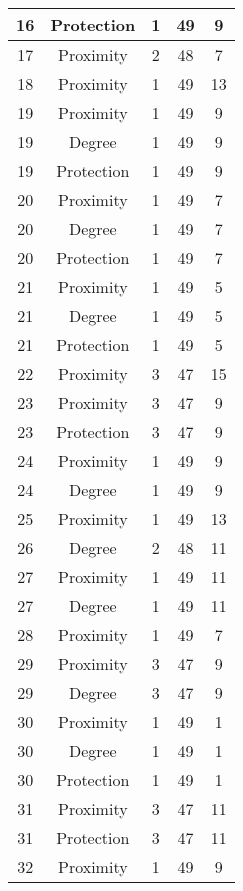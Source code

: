 \documentclass[results.tex]{subfiles}
\begin{document}
\begin{center}
\begin{tabular}{| c || c | c | c | c |}
    16 & Protection & 1 & 49 & 9 \\ 
    \hline
    17 & Proximity & 2 & 48 & 7 \\ 
    \hline
    18 & Proximity & 1 & 49 & 13 \\ 
    \hline
    19 & Proximity & 1 & 49 & 9 \\ 
    \hline
    19 & Degree & 1 & 49 & 9 \\ 
    \hline
    19 & Protection & 1 & 49 & 9 \\ 
    \hline
    20 & Proximity & 1 & 49 & 7 \\ 
    \hline
    20 & Degree & 1 & 49 & 7 \\ 
    \hline
    20 & Protection & 1 & 49 & 7 \\ 
    \hline
    21 & Proximity & 1 & 49 & 5 \\ 
    \hline
    21 & Degree & 1 & 49 & 5 \\ 
    \hline
    21 & Protection & 1 & 49 & 5 \\ 
    \hline
    22 & Proximity & 3 & 47 & 15 \\ 
    \hline
    23 & Proximity & 3 & 47 & 9 \\ 
    \hline
    23 & Protection & 3 & 47 & 9 \\ 
    \hline
    24 & Proximity & 1 & 49 & 9 \\ 
    \hline
    24 & Degree & 1 & 49 & 9 \\ 
    \hline
    25 & Proximity & 1 & 49 & 13 \\ 
    \hline
    26 & Degree & 2 & 48 & 11 \\ 
    \hline
    27 & Proximity & 1 & 49 & 11 \\ 
    \hline
    27 & Degree & 1 & 49 & 11 \\ 
    \hline
    28 & Proximity & 1 & 49 & 7 \\ 
    \hline
    29 & Proximity & 3 & 47 & 9 \\ 
    \hline
    29 & Degree & 3 & 47 & 9 \\ 
    \hline
    30 & Proximity & 1 & 49 & 1 \\ 
    \hline
    30 & Degree & 1 & 49 & 1 \\ 
    \hline
    30 & Protection & 1 & 49 & 1 \\ 
    \hline
    31 & Proximity & 3 & 47 & 11 \\ 
    \hline
    31 & Protection & 3 & 47 & 11 \\ 
    \hline
    32 & Proximity & 1 & 49 & 9 \\ 
    \hline

\end{tabular}
\end{center}
\end{document}
